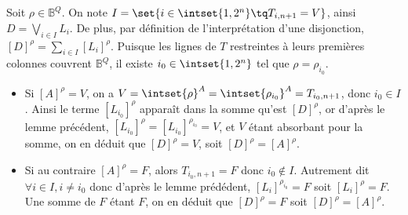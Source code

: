 \documentclass{scrartcl}
\begin{document}
				\begin{demo}
					\item Soit $\rho \in \mathbb{B}^Q$. On note $I = \set{i \in \intset{1,2^n} \tq T_{i,n+1} = V}$, ainsi $D = \bigvee_{i\in I} L_i$.
					De plus, par définition de l'interprétation d'une disjonction, $[D]^\rho = \sum_{i\in I} [L_i]^\rho$.
					Puisque les lignes de $T$ restreintes à leurs premières colonnes couvrent $\mathbb{B}^Q$, il existe $i_0 \in \intset{1,2^n}$ tel que $\rho = \rho_{i_0}$.
					\begin{itemize}
						\item Si $[A]^\rho = V$, on a $V = \intset{\rho}^A = \intset{\rho_{i_0}}^A = T_{i_0,n+1}$, donc $i_0 \in I$. 
						Ainsi le terme $[L_{i_0}]^\rho$ apparaît dans la somme qu'est $[D]^\rho$, or d'après le lemme précédent, $[L_{i_0}]^\rho = [L_{i_0}]^{\rho_{i_0}} = V$,
						et $V$ étant absorbant pour la somme, on en déduit que $[D]^\rho = V$, soit $[D]^\rho = [A]^\rho$.
						\item Si au contraire $[A]^\rho = F$, alors $T_{i_0,n+1} = F$ donc $i_0\not\in I$. Autrement dit $\forall i \in I, i\neq i_0$ donc d'après le lemme prédédent,
						$[L_i]^{\rho_{i_0}} = F$ soit $[L_i]^\rho = F$. Une somme de $F$ étant $F$, on en déduit que $[D]^\rho = F$ soit $[D]^\rho = [A]^\rho$.
					\end{itemize}
				\end{demo}
\end{document}

